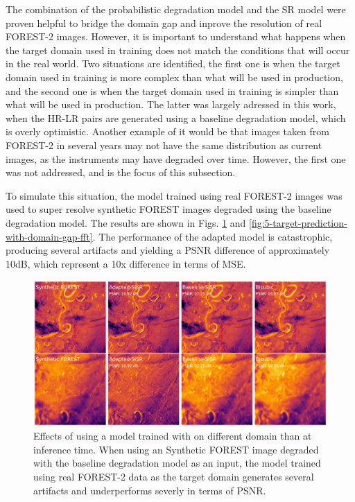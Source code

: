         The combination of the probabilistic degradation model and the SR model were proven helpful to bridge the domain gap and inprove the resolution of real FOREST-2 images.
        However, it is important to understand what happens when the target domain used in training does not match the conditions that will occur in the real world.
        Two situations are identified, the first one is when the target domain used in training is more complex than what will be used in production, and the second one is when the target domain used in training is simpler than what will be used in production.
        The latter was largely adressed in this work, when the HR-LR pairs are generated using a baseline degradation model, which is overly optimistic. 
        Another example of it would be that images taken from FOREST-2 in several years may not have the same distribution as current images, as the instruments may have degraded over time.
        However, the first one was not addressed, and is the focus of this subsection.
        
        To simulate this situation, the model trained using real FOREST-2 images was used to super resolve synthetic FOREST images degraded using the baseline degradation model.
        The results are shown in Figs. \ref{fig:5-target-prediction-with-domain-gap} and \ref{fig:5-target-prediction-with-domain-gap-fft}.
        The performance of the adapted model is catastrophic, producing several artifacts and yielding a PSNR difference of approximately 10dB, which represent a 10x difference in terms of MSE.

        \begin{figure}[H]
            \centering
            \includegraphics[scale=0.28]{Includes/5-target-prediction-with-domain-gap.pdf}
            \caption{Effects of using a model trained with on different domain than at inference time. 
                     When using an Synthetic FOREST image degraded with the baseline degradation model as an input, the model trained using real FOREST-2 data as the target domain generates several artifacts and underperforms severly in terms of PSNR. }
            \label{fig:5-target-prediction-with-domain-gap}
        \end{figure}

